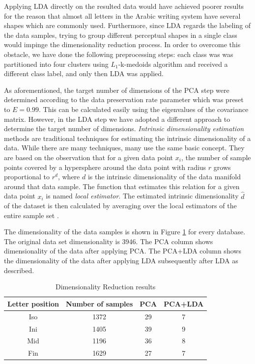 \documentclass[10pt, conference, compsocconf]{IEEEtran}
\theoremstyle{definition}
\begin{document}
\iftoggle{edit-mode}{\hspace{0pt}\marginpar{Implementation: Clustering and LDA}}{}
Applying LDA directly on the resulted data would have achieved poorer results for the reason that almost all letters in the Arabic writing system have several shapes which are commonly used. 
Furthermore, since LDA regards the labeling of the data samples, trying to group different perceptual shapes in a single class would impinge the dimensionality reduction process. 
In order to overcome this obstacle, we have done the following preprocessing steps: each class was was partitioned into four clusters using $L_1$-k-medoids algorithm and received a different class label, and only then LDA was applied.

As aforementioned, the target number of dimensions of the PCA step were determined according to the data preservation rate parameter which was preset to $E=0.99$. 
This can be calculated easily using the eigenvalues of the covariance matrix. 
However, in the LDA step we have adopted a different approach to determine the target number of dimensions. 
\emph{Intrinsic dimensionality estimation} methods are traditional techniques for estimating the intrinsic dimensionality of a data. 
While there are many techniques, many use the same basic concept. They are based on the observation that for a given data point $x_i$, the number of sample points covered by a hypersphere around the data point with radius $r$ grows proportional to $r^d$, where $d$ is the intrinsic dimensionality of the data manifold around that data sample.  
The function that estimates this relation for a given data point $x_i$ is named \emph{local estimator}.
The estimated intrinsic dimensionality $\hat{d}$ of the dataset is then calculated by averaging over the local estimators of the entire sample set \cite{van2007introduction}.

The dimensionality of the data samples is shown in Figure \ref{table:dr_dimensions_results} for every database. The original data set dimensionality is 3946. The PCA column shows dimensionality of the data after applying PCA. The PCA+LDA column shows the dimensionality of the data after applying LDA subsequently after LDA as described.

\begin{table}
\centering
\begin{tabular}{ | c | c | c | c |}
\hline
Letter position & Number of samples & PCA & PCA+LDA\\
\hline                 
  Iso & 1372 & 29 & 7 \\ 
  \hline
  Ini & 1405 & 39 & 9 \\ 
  \hline
  Mid & 1196 & 36 & 8 \\ 
  \hline
  Fin & 1629 & 27 & 7 \\ 
  \hline
\end{tabular}
\caption{Dimensionality Reduction results}
\label{table:dr_dimensions_results} 
\end{table}
\end{document}
